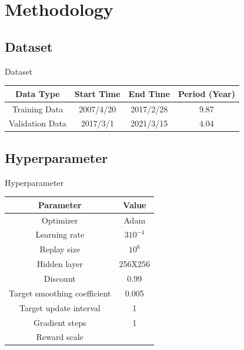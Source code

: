 \section{Methodology}


\subsection{Dataset}
\begin{frame}{Dataset}
    \begin{tabular}{||c|c|c|c||}
        \hline \hline
        Data Type & Start Time & End Time & Period (Year) \\ \hline \hline
        Training Data  &  2007/4/20 & 2017/2/28 & 9.87\\ \hline
        Validation Data & 2017/3/1 & 2021/3/15 & 4.04 \\ 
        \hline \hline
        \end{tabular}
\end{frame}

\subsection{Hyperparameter}
\begin{frame}{Hyperparameter}
\centering
 \begin{tabular}{| c|c | }
   \hline \hline
   Parameter & Value \\ \hline \hline
   Optimizer & Adam \\ \hline
   Learning rate & \(3 10^{-4}\) \\ \hline
   Replay size & \(10^6\) \\ \hline
   Hidden layer&   256X256  \\ \hline
   Discount & 0.99 \\ \hline
   Target smoothing coefficient & 0.005 \\ \hline
   Target update interval & 1 \\ \hline
   Gradient steps & 1 \\ \hline
   Reward scale & \color{blue}{1000} \\ \hline \hline
    \end{tabular}
\end{frame}

